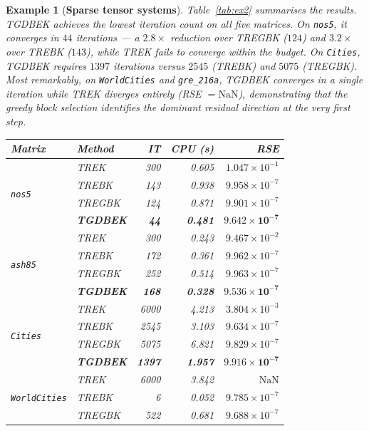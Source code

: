 \documentclass[11pt]{article}
\newtheorem{example}[theorem]{Example}
\begin{document}
\begin{example}[\textbf{Sparse tensor systems}]
Table~\ref{tab:ex2} summarises the results. TGDBEK achieves the lowest iteration count on all five matrices. On \texttt{nos5}, it converges in $44$ iterations — a $2.8\times$ reduction over TREGBK ($124$) and $3.2\times$ over TREBK ($143$), while TREK fails to converge within the budget. On \texttt{Cities}, TGDBEK requires $1397$ iterations versus $2545$ (TREBK) and $5075$ (TREGBK). Most remarkably, on \texttt{WorldCities} and \texttt{gre\_216a}, TGDBEK converges in a single iteration while TREK diverges entirely (RSE $=\mathrm{NaN}$), demonstrating that the greedy block selection identifies the dominant residual direction at the very first step.
\begin{table}[ht]
\centering\small\setlength{\tabcolsep}{5pt}
\begin{tabular}{llrrr}
\toprule
Matrix & Method & IT & CPU (s) & RSE \\
\midrule
\multirow{4}{*}{\texttt{nos5}}
  & TREK            & 300  & 0.605 & $1.047\times10^{-1}$ \\
  & TREBK           & 143  & 0.938 & $9.958\times10^{-7}$ \\
  & TREGBK          & 124  & 0.871 & $9.901\times10^{-7}$ \\
  & \textbf{TGDBEK} &  \textbf{44}  & \textbf{0.481} & $\mathbf{9.642\times10^{-7}}$ \\
\midrule
\multirow{4}{*}{\texttt{ash85}}
  & TREK            & 300  & 0.243 & $9.467\times10^{-2}$ \\
  & TREBK           & 172  & 0.361 & $9.962\times10^{-7}$ \\
  & TREGBK          & 252  & 0.514 & $9.963\times10^{-7}$ \\
  & \textbf{TGDBEK} & \textbf{168} & \textbf{0.328} & $\mathbf{9.536\times10^{-7}}$ \\
\midrule
\multirow{4}{*}{\texttt{Cities}}
  & TREK            & 6000 & 4.213 & $3.804\times10^{-3}$ \\
  & TREBK           & 2545 & 3.103 & $9.634\times10^{-7}$ \\
  & TREGBK          & 5075 & 6.821 & $9.829\times10^{-7}$ \\
  & \textbf{TGDBEK} & \textbf{1397} & \textbf{1.957} & $\mathbf{9.916\times10^{-7}}$ \\
\midrule
\multirow{4}{*}{\texttt{WorldCities}}
  & TREK            & 6000 & 3.842 & $\mathrm{NaN}$ \\
  & TREBK           &    6 & 0.052 & $9.785\times10^{-7}$ \\
  & TREGBK          &  522 & 0.681 & $9.688\times10^{-7}$ \\

\end{tabular}
\end{table}
\end{example}
\end{document}
